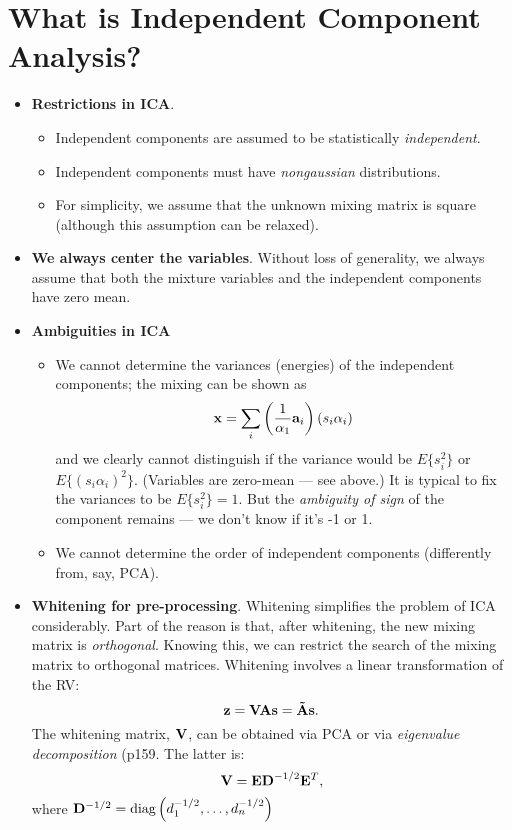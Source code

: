 \documentclass[a4paper]{book}
\begin{document}




\chapter{What is Independent Component Analysis?}

\begin{itemize}
\item \textbf{Restrictions in ICA}.
	\begin{itemize}
	\item Independent components are assumed to be statistically \textit{independent}.
	\item Independent components must have \textit{nongaussian} distributions.
	\item For simplicity, we assume that the unknown mixing matrix is square (although this assumption can be relaxed).
	\end{itemize}
	\item \textbf{We always center the variables}. Without loss of generality, we always assume that both the mixture variables and the independent components have zero mean.
\item \textbf{Ambiguities in ICA}
	\begin{itemize}
	\item We cannot determine the variances (energies) of the independent components; the mixing can be shown as $$\mathbf{x} = \sum\limits_i \left( \frac{1}{\alpha_1}\mathbf{a}_i \right)(s_i\alpha_i)$$
	and we clearly cannot distinguish if the variance would be $E\{s_i^2\}$ or $E\{(s_i\alpha_i)^2\}$. (Variables are zero-mean \---- see above.) It is typical to fix the variances to be $E\{s_i^2\}=1$. But the \textit{ambiguity of sign} of the component remains \---- we don't know if it's -1 or 1.
	\item We cannot determine the order of independent components (differently from, say, PCA).
	\end{itemize}
\item \textbf{Whitening for pre-processing}. Whitening simplifies the problem of ICA considerably. Part of the reason is that, after whitening, the new mixing matrix is \textit{orthogonal}. Knowing this, we can restrict the search of the mixing matrix to orthogonal matrices. Whitening involves a linear transformation of the RV:%
$$\mathbf{z=VAs=\tilde{A}s}.$$
The whitening matrix, $\mathbf V$, can be obtained via PCA or via \textit{eigenvalue decomposition} (p159. The latter is: $$\mathbf{V=ED}^{-1/2}\mathbf{E}^T,$$ 
where $\mathbf D^{-1/2} = \text{diag}\left(d_1^{-1/2},\hdots,d_n^{-1/2}\right)$


\end{itemize}
\end{document}

